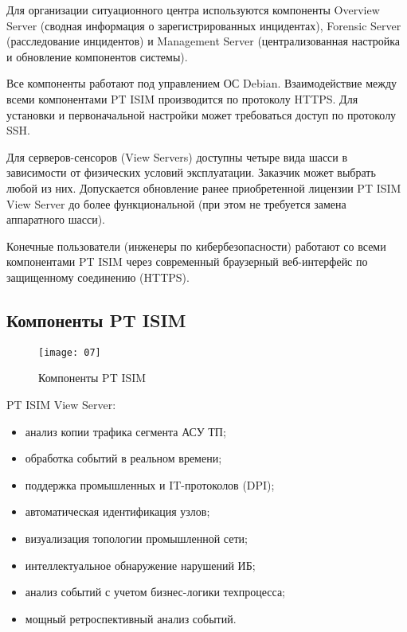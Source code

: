 Для организации ситуационного центра используются компоненты Overview Server (сводная информация о зарегистрированных инцидентах), Forensic Server (расследование инцидентов) и Management Server (централизованная настройка и обновление компонентов системы).\par

Все компоненты работают под управлением ОС Debian. Взаимодействие между всеми компонентами PT ISIM производится по протоколу HTTPS. Для установки и первоначальной настройки может требоваться доступ по протоколу SSH.\par

Для серверов-сенсоров (View Servers) доступны четыре вида шасси в зависимости от физических условий эксплуатации. Заказчик может выбрать любой из них. Допускается обновление ранее приобретенной лицензии PT ISIM View Server до более функциональной (при этом не требуется замена аппаратного шасси).\par

Конечные пользователи (инженеры по кибербезопасности) работают со всеми компонентами PT ISIM через современный браузерный веб-интерфейс по защищенному соединению (HTTPS).\\

\subsection{Компоненты PT ISIM}

\begin{figure}[h!]
    \centering
    \texttt{[image: 07]}
    \caption{Компоненты PT ISIM}
    \label{img:07}
\end{figure}

PT ISIM View Server:
\begin{itemize}
    \item анализ копии трафика сегмента АСУ ТП;
    \item обработка событий в реальном времени;
    \item поддержка промышленных и IT-протоколов (DPI);
    \item автоматическая идентификация узлов;
    \item визуализация топологии промышленной сети;
    \item интеллектуальное обнаружение нарушений ИБ;
    \item анализ событий с учетом бизнес-логики техпроцесса;
    \item мощный ретроспективный анализ событий.
\end{itemize}

